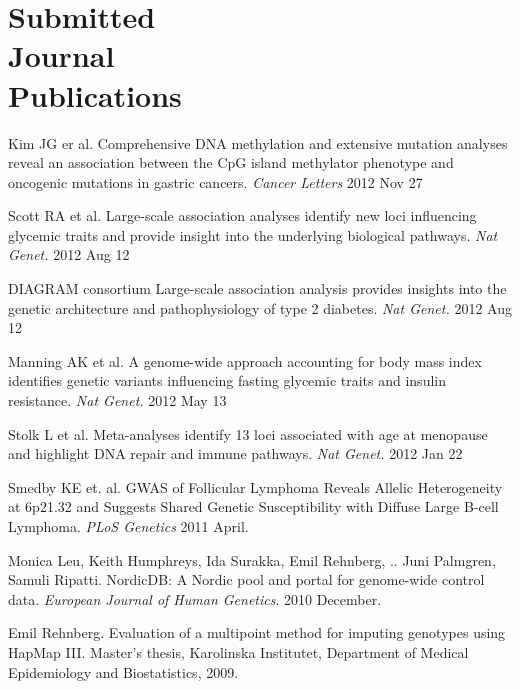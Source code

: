 %
%
\section{Submitted\\Journal\\Publications} \begin{bibsection}
\item Kim JG er al.
	Comprehensive DNA methylation and extensive mutation analyses reveal an association between the CpG island methylator phenotype and oncogenic mutations in gastric cancers.
	\emph{Cancer Letters} 2012 Nov 27
\item Scott RA et al.
	Large-scale association analyses identify new loci influencing glycemic traits and provide insight into the underlying biological pathways.
	\emph{Nat Genet.} 2012 Aug 12
    \item DIAGRAM consortium
	Large-scale association analysis provides insights into the genetic architecture and pathophysiology of type 2 diabetes.
	\emph{Nat Genet.} 2012 Aug 12
    \item Manning AK et al.
	A genome-wide approach accounting for body mass index identifies genetic variants influencing fasting glycemic traits and insulin resistance.
	\emph{Nat Genet.} 2012 May 13
    \item Stolk L et al.
	Meta-analyses identify 13 loci associated with age at menopause and highlight DNA repair and immune pathways.
	\emph{Nat Genet.} 2012 Jan 22
    \item Smedby KE et. al.
	GWAS of Follicular Lymphoma Reveals Allelic Heterogeneity at 6p21.32 and Suggests Shared Genetic Susceptibility with Diffuse Large B-cell Lymphoma.
	\emph{PLoS Genetics} 2011 April.
    \item Monica Leu, Keith Humphreys, Ida Surakka, Emil Rehnberg, .. Juni Palmgren, Samuli Ripatti.
	NordicDB: A Nordic pool and portal for genome-wide control data.
	\emph{European Journal of Human Genetics}. 2010 December.
    \item Emil Rehnberg.
	Evaluation of a multipoint method for imputing genotypes using HapMap III.
	Master’s thesis, Karolinska Institutet, Department of Medical Epidemiology and Biostatistics, 2009.
\end{bibsection}

%
%

